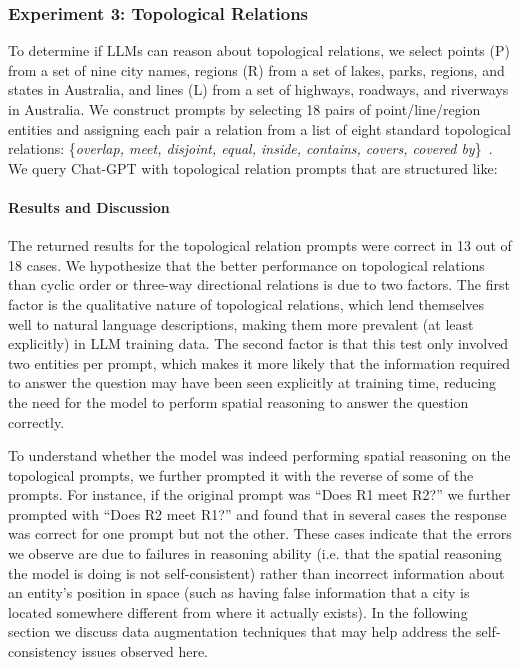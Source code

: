 \subsubsection{Experiment 3: Topological Relations}
To determine if LLMs can reason about topological relations, we select points (P) from a set of nine city names, regions (R) from a set of lakes, parks, regions, and states in Australia, and lines (L) from a set of highways, roadways, and riverways in Australia.
We construct prompts by selecting 18 pairs of point/line/region entities and assigning each pair a relation from a list of eight standard topological relations: \{\textit{overlap, meet, disjoint, equal, inside, contains, covers, covered by}\}~\cite{Carniel2023}.
We query Chat-GPT with topological relation prompts that are structured like:
\begin{center}
\end{center}

\paragraph{Results and Discussion}
The returned results for the topological relation prompts were correct in 13 out of 18 cases.
We hypothesize that the better performance on topological relations than cyclic order or three-way directional relations is due to two factors.
The first factor is the qualitative nature of topological relations, which lend themselves well to natural language descriptions, making them more prevalent (at least explicitly) in LLM training data.
The second factor is that this test only involved two entities per prompt, which makes it more likely that the information required to answer the question may have been seen explicitly at training time, reducing the need for the model to perform spatial reasoning to answer the question correctly.

To understand whether the model was indeed performing spatial reasoning on the topological prompts, we further prompted it with the reverse of some of the prompts.
For instance, if the original prompt was ``Does R1 meet R2?'' we further prompted with ``Does R2 meet R1?'' and found that in several cases the response was correct for one prompt but not the other.
These cases indicate that the errors we observe are due to failures in reasoning ability (i.e. that the spatial reasoning the model is doing is not self-consistent) rather than incorrect information about an entity's position in space (such as having false information that a city is located somewhere different from where it actually exists).
In the following section we discuss data augmentation techniques that may help address the self-consistency issues observed here.



